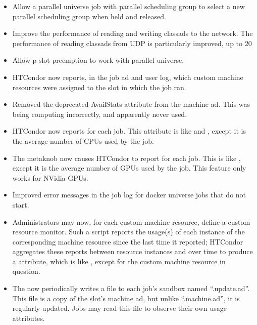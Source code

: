 \begin{itemize}

\item Allow a parallel universe job with parallel scheduling group to
select a new parallel scheduling group when held and released.

\item Improve the performance of reading and writing classads to the network.
The performance of reading classads from UDP is particularly improved, up
to 20%

\item Allow p-slot preemption to work with parallel universe.

\item HTCondor now reports, in the job ad and user log, which custom machine
resources were assigned to the slot in which the job ran.

\item Removed the deprecated AvailStats attribute from the machine ad. This
was being computing incorrectly, and apparently never used.

\item HTCondor now reports  for each job.  This attribute is
like  and , except it is the average number
of CPUs used by the job.

\item The  metaknob now causes HTCondor to report
 for each job.  This is like , except it is
the average number of GPUs used by the job.  This feature only works for
NVidia GPUs.

\item Improved error messages in the job log for docker universe jobs
that do not start.

\item Administrators may now, for each custom machine resource, define a
custom resource monitor.  Such a script reports the usage(s) of each
instance of the corresponding machine resource since the last time it
reported; HTCondor aggregates these reports between resource instances and
over time to produce a  attribute, which is like
, except for the custom machine resource in question.

\item The  now periodically writes a file to each job's
sandbox named ``.update.ad''.  This file is a copy of the slot's machine ad,
but unlike ``.machine.ad'', it is regularly updated.  Jobs may read this
file to observe their own usage attributes.


\end{itemize}
